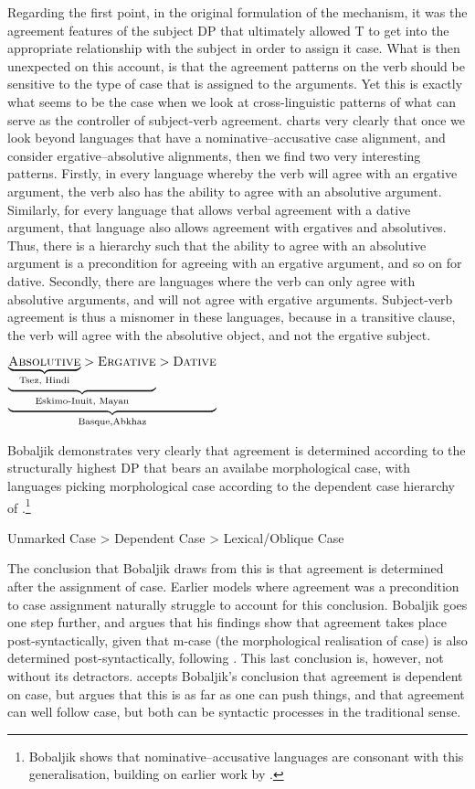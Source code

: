 \documentclass[output=paper
,modfonts
,nonflat]{langsci/langscibook}
\begin{document}
Regarding the first point, in the original formulation of the {\agr} mechanism, it was the agreement features of the subject DP that ultimately allowed T to get into the appropriate relationship with the subject in order to assign it case.
What is then unexpected on this account, is that the agreement patterns on the verb should be sensitive to the type of case that is assigned to the arguments.
Yet this is exactly what seems to be the case when we look at cross-linguistic patterns of what can serve as the controller of subject-verb agreement.
\citet{Bobaljik2008} charts very clearly that once we look beyond languages that have a nominative--accusative case alignment, and consider ergative--absolutive alignments, then we find two very interesting patterns.
Firstly, in every language whereby the verb will agree with an ergative argument, the verb also has the ability to agree with an absolutive argument.
Similarly, for every language that allows verbal agreement with a dative argument, that language also allows agreement with ergatives and absolutives.
Thus, there is a hierarchy such that the ability to agree with an absolutive argument is a precondition for agreeing with an ergative argument, and so on for dative.
Secondly, there are languages where the verb can only agree with absolutive arguments, and will not agree with ergative arguments.
Subject-verb agreement is thus a misnomer in these languages, because in a transitive clause, the verb will agree with the absolutive object, and not the ergative subject.
\begin{exe}
	\ex
	$\underbrace{\underbrace{\underbrace{\textsc{Absolutive}}_{\text{Tsez, Hindi}} > \textsc{Ergative}}_{\text{Eskimo-Inuit, Mayan}} > \textsc{Dative}}_{\text{Basque,Abkhaz}}$
\end{exe}
Bobaljik demonstrates very clearly that agreement is determined according to the structurally highest DP that bears an availabe morphological case, with languages picking morphological case according to the dependent case hierarchy of \citet{Marantz1991}.\footnote{Bobaljik shows that nominative--accusative languages are consonant with this generalisation, building on earlier work by \citet{Moravcsik1974}.}
\begin{exe}
	\ex
	Unmarked Case \textgreater {} Dependent Case \textgreater {} Lexical/Oblique Case
\end{exe}
The conclusion that Bobaljik draws from this is that agreement is determined after the assignment of case.
Earlier models where agreement was a precondition to case assignment naturally struggle to account for this conclusion.
Bobaljik goes one step further, and argues that his findings show that agreement takes place post-syntactically, given that m-case (the morphological realisation of case) is also determined post-syntactically, following \citet{Marantz1991}.
This last conclusion is, however, not without its detractors.
\citet{preminger2011,preminger2015} accepts Bobaljik's conclusion that agreement is dependent on case, but argues that this is as far as one can push things, and that agreement can well follow case, but both can be syntactic processes in the traditional sense.
\end{document}
